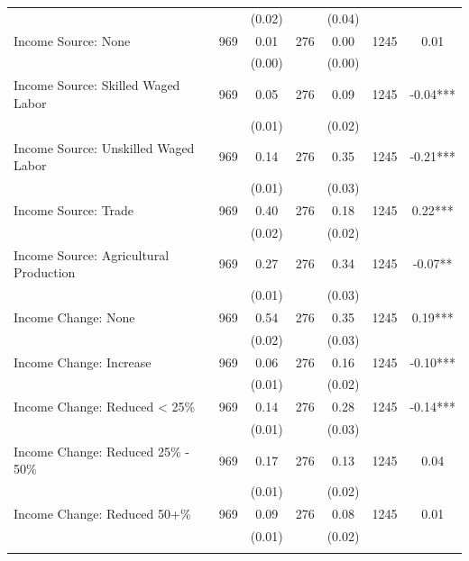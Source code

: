 \begin{tabular}{@{\extracolsep{5pt}}lcccccc}
 &   & (0.02)  &   & (0.04)  &   &  \\ [1ex]
Income Source: None   & 969    & 0.01    & 276    & 0.00    & 1245    & 0.01   \\
 &   & (0.00)  &   & (0.00)  &   &  \\ [1ex]
Income Source: Skilled Waged Labor   & 969    & 0.05    & 276    & 0.09    & 1245    & -0.04***   \\
 &   & (0.01)  &   & (0.02)  &   &  \\ [1ex]
Income Source: Unskilled Waged Labor   & 969    & 0.14    & 276    & 0.35    & 1245    & -0.21***   \\
 &   & (0.01)  &   & (0.03)  &   &  \\ [1ex]
Income Source: Trade   & 969    & 0.40    & 276    & 0.18    & 1245    & 0.22***   \\
 &   & (0.02)  &   & (0.02)  &   &  \\ [1ex]
Income Source: Agricultural Production   & 969    & 0.27    & 276    & 0.34    & 1245    & -0.07**   \\
 &   & (0.01)  &   & (0.03)  &   &  \\ [1ex]
Income Change: None   & 969    & 0.54    & 276    & 0.35    & 1245    & 0.19***   \\
 &   & (0.02)  &   & (0.03)  &   &  \\ [1ex]
Income Change: Increase   & 969    & 0.06    & 276    & 0.16    & 1245    & -0.10***   \\
 &   & (0.01)  &   & (0.02)  &   &  \\ [1ex]
Income Change: Reduced < 25\%   & 969    & 0.14    & 276    & 0.28    & 1245    & -0.14***   \\
 &   & (0.01)  &   & (0.03)  &   &  \\ [1ex]
Income Change: Reduced 25\% - 50\%   & 969    & 0.17    & 276    & 0.13    & 1245    & 0.04   \\
 &   & (0.01)  &   & (0.02)  &   &  \\ [1ex]
Income Change: Reduced 50+\%   & 969    & 0.09    & 276    & 0.08    & 1245    & 0.01   \\
 &   & (0.01)  &   & (0.02)  &   &  \\ [1ex]
\hline \hline \\[-1.8ex]

\end{tabular}
